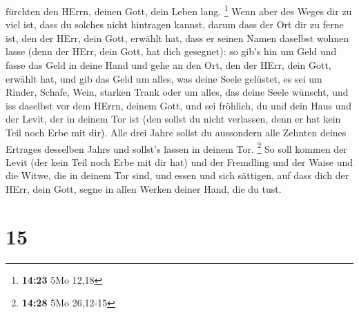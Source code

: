 fürchten den HErrn, deinen Gott, dein Leben lang. \footnote{\textbf{14:23}
  5Mo 12,18}  Wenn aber des Weges dir zu viel ist, dass
du solches nicht hintragen kannst, darum dass der Ort dir zu ferne ist,
den der HErr, dein Gott, erwählt hat, dass er seinen Namen daselbst
wohnen lasse (denn der HErr, dein Gott, hat dich gesegnet):
 so gib's hin um Geld und fasse das Geld in deine Hand
und gehe an den Ort, den der HErr, dein Gott, erwählt hat,
 und gib das Geld um alles, was deine Seele gelüstet, es
sei um Rinder, Schafe, Wein, starken Trank oder um alles, das deine
Seele wünscht, und iss daselbst vor dem HErrn, deinem Gott, und sei
fröhlich, du und dein Haus  und der Levit, der in deinem
Tor ist (den sollst du nicht verlassen, denn er hat kein Teil noch Erbe
mit dir).  Alle drei Jahre sollst du aussondern alle
Zehnten deines Ertrages desselben Jahrs und sollst's lassen in deinem
Tor. \footnote{\textbf{14:28} 5Mo 26,12-15}  So soll
kommen der Levit (der kein Teil noch Erbe mit dir hat) und der Fremdling
und der Waise und die Witwe, die in deinem Tor sind, und essen und sich
sättigen, auf dass dich der HErr, dein Gott, segne in allen Werken
deiner Hand, die du tust.

\hypertarget{section-14}{%
\section{15}\label{section-14}}

